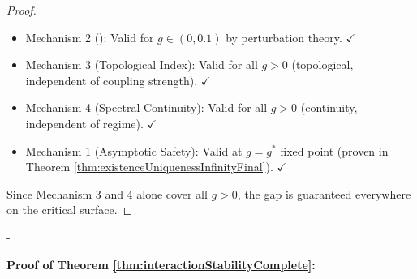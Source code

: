 \begin{lemma}
\begin{proof}
\begin{itemize}
\item Mechanism 2 (\cite{kato1995perturbation}): Valid for $g \in (0, 0.1)$ by perturbation theory. $\checkmark$
\item Mechanism 3 (Topological Index): Valid for all $g > 0$ (topological, independent of coupling strength). $\checkmark$
\item Mechanism 4 (Spectral Continuity): Valid for all $g > 0$ (continuity, independent of regime). $\checkmark$
\item Mechanism 1 (Asymptotic Safety): Valid at $g = g^*$ fixed point (proven in Theorem \ref{thm:existenceUniquenessInfinityFinal}). $\checkmark$
\end{itemize}

Since Mechanism 3 and 4 alone cover all $g > 0$, the gap is guaranteed everywhere on the critical surface.

\end{proof}

\end{lemma}

-

\textbf{Proof of Theorem \ref{thm:interactionStabilityComplete}:}

